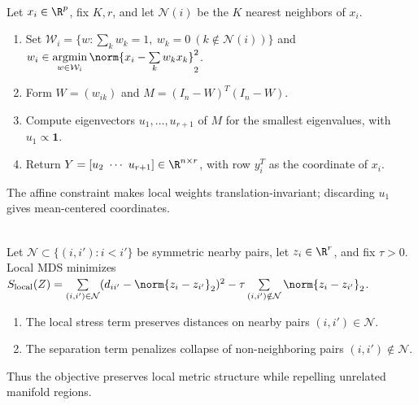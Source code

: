 \begin{method} \label{meth:sl-locally-linear-embedding} \\
Let $x_i\in\R^p$, fix $K,r$, and let $\mathcal{N}(i)$ be the $K$ nearest neighbors of $x_i$.
\begin{enumerate}[label=(\roman*)]
\setlength{\itemsep}{0pt}
\item Set $\mathcal{W}_i=\{w:\sum\limits_k w_k=1,\ w_k=0\ (k\notin\mathcal{N}(i))\}$ and $w_i\in\operatorname*{argmin}\limits_{w\in\mathcal{W}_i}\norm{x_i-\sum\limits_k w_kx_k}_2^2$.
\item Form $W=(w_{ik})$ and $M=(I_n-W)^T(I_n-W)$.
\item Compute eigenvectors $u_1,\ldots,u_{r+1}$ of $M$ for the smallest eigenvalues, with $u_1\propto\mathbf{1}$.
\item Return $Y=[u_2\ \cdots\ u_{r+1}]\in\R^{n\times r}$, with row $y_i^T$ as the coordinate of $x_i$.
\end{enumerate}
The affine constraint makes local weights translation-invariant; discarding $u_1$ gives mean-centered coordinates.
\end{method}

\begin{method} \label{meth:sl-local-multidimensional-scaling} \\
Let $\mathcal{N}\subset\{(i,i'):i<i'\}$ be symmetric nearby pairs, let $z_i\in\R^r$, and fix $\tau>0$.\\
Local MDS minimizes $S_{\mathrm{local}}(Z)=\sum\limits_{(i,i')\in\mathcal{N}}(d_{ii'}-\norm{z_i-z_{i'}}_2)^2-\tau\sum\limits_{(i,i')\notin\mathcal{N}}\norm{z_i-z_{i'}}_2$.
\begin{enumerate}[label=(\roman*)]
\setlength{\itemsep}{0pt}
\item The local stress term preserves distances on nearby pairs $(i,i')\in\mathcal{N}$.
\item The separation term penalizes collapse of non-neighboring pairs $(i,i')\notin\mathcal{N}$.
\end{enumerate}
Thus the objective preserves local metric structure while repelling unrelated manifold regions.
\end{method}

